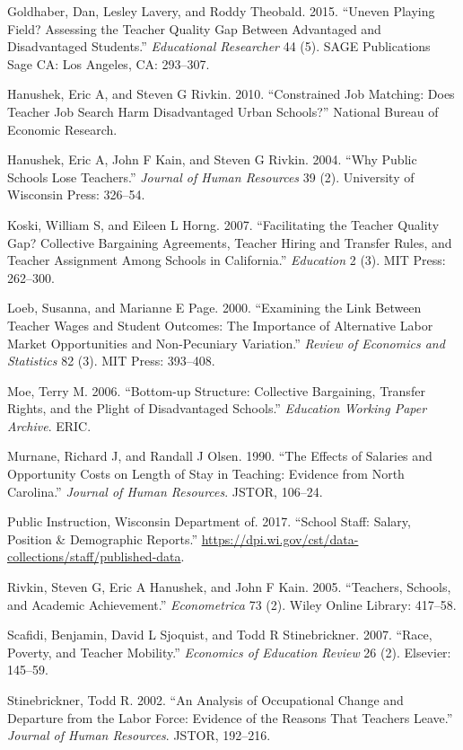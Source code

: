 \documentclass[]{article}
\begin{document}
\hypertarget{ref-goldhaber2015}{}
Goldhaber, Dan, Lesley Lavery, and Roddy Theobald. 2015. ``Uneven
Playing Field? Assessing the Teacher Quality Gap Between Advantaged and
Disadvantaged Students.'' \emph{Educational Researcher} 44 (5). SAGE
Publications Sage CA: Los Angeles, CA: 293--307.

\hypertarget{ref-hanushek2010}{}
Hanushek, Eric A, and Steven G Rivkin. 2010. ``Constrained Job Matching:
Does Teacher Job Search Harm Disadvantaged Urban Schools?'' National
Bureau of Economic Research.

\hypertarget{ref-hanushek}{}
Hanushek, Eric A, John F Kain, and Steven G Rivkin. 2004. ``Why Public
Schools Lose Teachers.'' \emph{Journal of Human Resources} 39 (2).
University of Wisconsin Press: 326--54.

\hypertarget{ref-koski}{}
Koski, William S, and Eileen L Horng. 2007. ``Facilitating the Teacher
Quality Gap? Collective Bargaining Agreements, Teacher Hiring and
Transfer Rules, and Teacher Assignment Among Schools in California.''
\emph{Education} 2 (3). MIT Press: 262--300.

\hypertarget{ref-loeb}{}
Loeb, Susanna, and Marianne E Page. 2000. ``Examining the Link Between
Teacher Wages and Student Outcomes: The Importance of Alternative Labor
Market Opportunities and Non-Pecuniary Variation.'' \emph{Review of
Economics and Statistics} 82 (3). MIT Press: 393--408.

\hypertarget{ref-moe}{}
Moe, Terry M. 2006. ``Bottom-up Structure: Collective Bargaining,
Transfer Rights, and the Plight of Disadvantaged Schools.''
\emph{Education Working Paper Archive}. ERIC.

\hypertarget{ref-murnane}{}
Murnane, Richard J, and Randall J Olsen. 1990. ``The Effects of Salaries
and Opportunity Costs on Length of Stay in Teaching: Evidence from North
Carolina.'' \emph{Journal of Human Resources}. JSTOR, 106--24.

\hypertarget{ref-dpi}{}
Public Instruction, Wisconsin Department of. 2017. ``School Staff:
Salary, Position \& Demographic Reports.''
\url{https://dpi.wi.gov/cst/data-collections/staff/published-data}.

\hypertarget{ref-rivkin}{}
Rivkin, Steven G, Eric A Hanushek, and John F Kain. 2005. ``Teachers,
Schools, and Academic Achievement.'' \emph{Econometrica} 73 (2). Wiley
Online Library: 417--58.

\hypertarget{ref-scafidi}{}
Scafidi, Benjamin, David L Sjoquist, and Todd R Stinebrickner. 2007.
``Race, Poverty, and Teacher Mobility.'' \emph{Economics of Education
Review} 26 (2). Elsevier: 145--59.

\hypertarget{ref-stinebrickner}{}
Stinebrickner, Todd R. 2002. ``An Analysis of Occupational Change and
Departure from the Labor Force: Evidence of the Reasons That Teachers
Leave.'' \emph{Journal of Human Resources}. JSTOR, 192--216.
\end{document}
